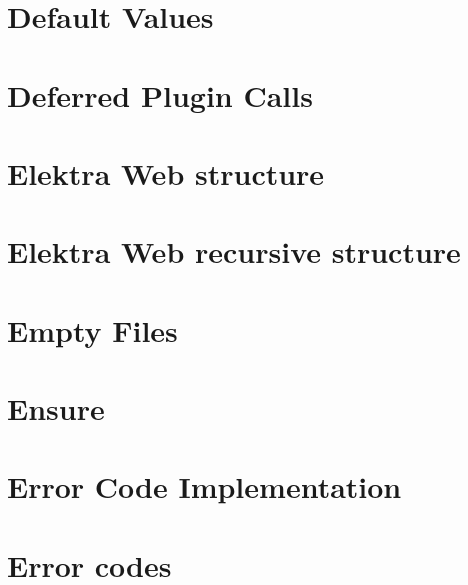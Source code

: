 \let\mypdfximage\pdfximage\def\pdfximage{\immediate\mypdfximage}\documentclass[twoside]{book}
\newcommand{\+}{\discretionary{\mbox{\scriptsize$\hookleftarrow$}}{}{}}
\begin{document}
\chapter{Default Values}
\label{doc_decisions_6_implemented_default_values_md}

\chapter{Deferred Plugin Calls}
\label{doc_decisions_6_implemented_deferred_plugin_calls_md}

\chapter{Elektra Web structure}
\label{doc_decisions_6_implemented_elektra_web_md}

\chapter{Elektra Web recursive structure}
\label{doc_decisions_6_implemented_elektra_web_recursive_md}

\chapter{Empty Files}
\label{doc_decisions_6_implemented_empty_files_md}

\chapter{Ensure}
\label{doc_decisions_6_implemented_ensure_md}

\chapter{Error Code Implementation}
\label{doc_decisions_6_implemented_error_code_implementation_md}

\chapter{Error codes}
\label{doc_decisions_6_implemented_error_codes_md}

\end{document}
